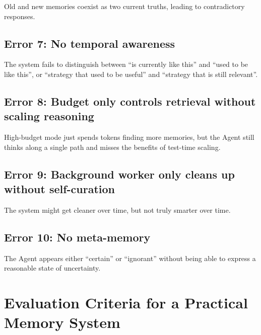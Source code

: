 \documentclass[a4paper,12pt]{article}
\begin{document}
Old and new memories coexist as two current truths, leading to contradictory responses.

\subsection*{Error 7: No temporal awareness}

The system fails to distinguish between ``is currently like this'' and ``used to be like this'', or ``strategy that used to be useful'' and ``strategy that is still relevant''.

\subsection*{Error 8: Budget only controls retrieval without scaling reasoning}

High-budget mode just spends tokens finding more memories, but the Agent still thinks along a single path and misses the benefits of test-time scaling.

\subsection*{Error 9: Background worker only cleans up without self-curation}

The system might get cleaner over time, but not truly smarter over time.

\subsection*{Error 10: No meta-memory}

The Agent appears either ``certain'' or ``ignorant'' without being able to express a reasonable state of uncertainty.

\section{Evaluation Criteria for a Practical Memory System}
\end{document}
